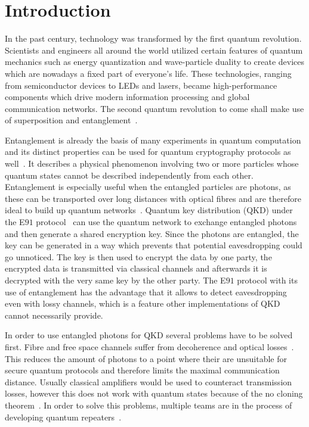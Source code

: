 \chapter{Introduction}

In the past century, technology was transformed by the first quantum revolution. Scientists and engineers all around the world utilized certain features of quantum mechanics such as energy quantization and wave-particle duality to create devices which are nowadays a fixed part of everyone's life.
These technologies, ranging from semiconductor devices to LEDs and lasers, became high-performance components which drive modern information processing and global communication networks.
The second quantum revolution to come shall make use of superposition and entanglement~\cite{aharonovich_solid-state_2016}\cite{macfarlane_quantum_2003}.

Entanglement is already the basis of many experiments in quantum computation and its distinct properties can be used for quantum cryptography protocols as well~\cite{zeilinger_light_2017}.
It describes a physical phenomenon involving two or more particles whose quantum states cannot be described independently from each other.
Entanglement is especially useful when the entangled particles are photons, as these can be transported over long distances with optical fibres and are therefore ideal to build up quantum networks~\cite{gisin_quantum_2002}.
Quantum key distribution (QKD) under the E$91$ protocol~\cite{ekert_quantum_1991} can use the quantum network to exchange entangled photons and then generate a shared encryption key.
Since the photons are entangled, the key can be generated in a way which prevents that potential eavesdropping could go unnoticed.
The key is then used to encrypt the data by one party, the encrypted data is transmitted via classical channels and afterwards it is decrypted with the very same key by the other party.
The E$91$ protocol with its use of entanglement has the advantage that it allows to detect eavesdropping even with lossy channels, which is a feature other implementations of QKD cannot necessarily provide.

In order to use entangled photons for QKD several problems have to be solved first.
Fibre and free space channels suffer from decoherence and optical losses~\cite{sangouard_quantum_2011}.
This reduces the amount of photons to a point where their are unsuitable for secure quantum protocols and therefore limits the maximal communication distance.
Usually classical amplifiers would be used to counteract transmission losses, however this does not work with quantum states because of the no cloning theorem~\cite{park_concept_1970}.
In order to solve this problems, multiple teams are in the process of developing quantum repeaters~\cite{reindl_all-photonic_2018}\cite{duan_long-distance_2001}\cite{simon_quantum_2007}.

